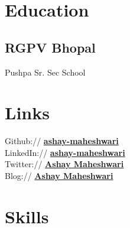 \documentclass[letterpaper]{deedy-resume} %
\begin{document}
\begin{minipage}[t]{0.33\textwidth} %


\section{Education} 

\subsection{RGPV Bhopal}


\sectionspace %

Pushpa Sr. Sec School \\

\sectionspace %


\section{Links} 

Github:// \href{https://github.com/ashay-maheshwari}{\bf ashay-maheshwari} \\
LinkedIn:// \href{https://www.linkedin.com/in/ashay-maheshwari}{\bf ashay-maheshwari} \\
Twitter:// \href{https://twitter.com/aashay_aarya}{\bf Ashay Maheshwari} \\
Blog:// \href{https://medium.com/@aashay_arya}{\bf Ashay Maheshwari}


\sectionspace %


\section{Skills}
\sectionspace %

\end{minipage}
\end{document}
